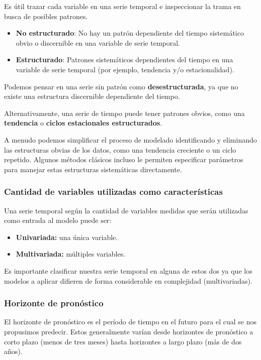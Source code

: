 \documentclass[a4paper,12pt]{article}
\begin{document}
Es útil trazar cada variable en una serie temporal e inspeccionar la trama en busca de posibles patrones.

\begin{itemize}
	\item \textbf{No estructurado}: No hay un patrón dependiente del tiempo sistemático obvio o discernible en una variable de serie temporal.

	\item \textbf{Estructurado}: Patrones sistemáticos dependientes del tiempo en una variable de serie temporal (por ejemplo, tendencia y/o estacionalidad).
\end{itemize}

Podemos pensar en una serie sin patrón como \textbf{desestructurada}, ya que no existe una estructura discernible dependiente del tiempo.

Alternativamente, una serie de tiempo puede tener patrones obvios, como una \textbf{tendencia} o \textbf{ciclos estacionales estructurados}.

A menudo podemos simplificar el proceso de modelado identificando y eliminando las estructuras obvias de los datos, como una tendencia creciente o un ciclo repetido. Algunos métodos clásicos incluso le permiten especificar parámetros para manejar estas estructuras sistemáticas directamente.

\subsubsection{Cantidad de variables utilizadas como características}

Una serie temporal según la cantidad de variables medidas que serán utilizadas como entrada al modelo puede ser:
\begin{itemize}
	\item \textbf{Univariada:} una única variable.
	\item \textbf{Multivariada:} múltiples variables. 
\end{itemize}

Es importante clasificar nuestra serie temporal en alguna de estos dos ya que los modelos a aplicar difieren de forma considerable en complejidad (multivariadas).

\subsubsection{Horizonte de pronóstico}

El horizonte de pronóstico es el período de tiempo en el futuro para el cual se nos propusimos predecir. Estos generalmente varían desde horizontes de pronóstico a corto plazo (menos de tres meses) hasta horizontes a largo plazo (más de dos años).
\end{document}
